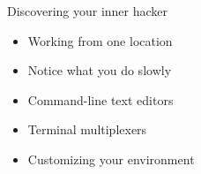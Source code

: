 \begin{frame}{Discovering your inner hacker}
    \stretchon
\begin{itemize}
    \item Working from one location
    \item Notice what you do slowly
    \item Command-line text editors
    \item Terminal multiplexers
    \item Customizing your environment
\end{itemize}
\end{frame}
